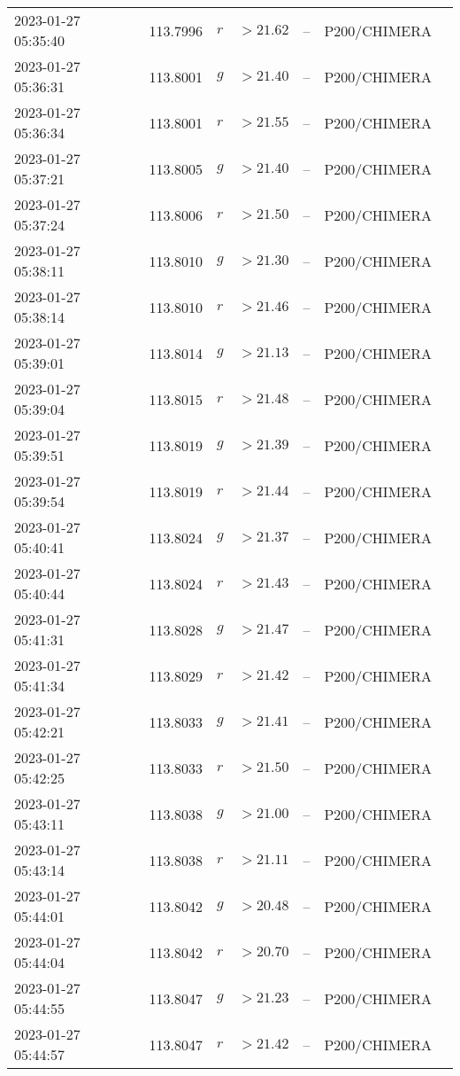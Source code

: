 \documentclass{nature_plusfigure}
\begin{document}
\begin{supplement}
\begin{center}
\begin{longtable}{lllllll}
2023-01-27 05:35:40 & 113.7996 & $r$ & $>21.62$ & -- & P200/CHIMERA &  \\ 
2023-01-27 05:36:31 & 113.8001 & $g$ & $>21.40$ & -- & P200/CHIMERA &  \\ 
2023-01-27 05:36:34 & 113.8001 & $r$ & $>21.55$ & -- & P200/CHIMERA &  \\ 
2023-01-27 05:37:21 & 113.8005 & $g$ & $>21.40$ & -- & P200/CHIMERA &  \\ 
2023-01-27 05:37:24 & 113.8006 & $r$ & $>21.50$ & -- & P200/CHIMERA &  \\ 
2023-01-27 05:38:11 & 113.8010 & $g$ & $>21.30$ & -- & P200/CHIMERA &  \\ 
2023-01-27 05:38:14 & 113.8010 & $r$ & $>21.46$ & -- & P200/CHIMERA &  \\ 
2023-01-27 05:39:01 & 113.8014 & $g$ & $>21.13$ & -- & P200/CHIMERA &  \\ 
2023-01-27 05:39:04 & 113.8015 & $r$ & $>21.48$ & -- & P200/CHIMERA &  \\ 
2023-01-27 05:39:51 & 113.8019 & $g$ & $>21.39$ & -- & P200/CHIMERA &  \\ 
2023-01-27 05:39:54 & 113.8019 & $r$ & $>21.44$ & -- & P200/CHIMERA &  \\ 
2023-01-27 05:40:41 & 113.8024 & $g$ & $>21.37$ & -- & P200/CHIMERA &  \\ 
2023-01-27 05:40:44 & 113.8024 & $r$ & $>21.43$ & -- & P200/CHIMERA &  \\ 
2023-01-27 05:41:31 & 113.8028 & $g$ & $>21.47$ & -- & P200/CHIMERA &  \\ 
2023-01-27 05:41:34 & 113.8029 & $r$ & $>21.42$ & -- & P200/CHIMERA &  \\ 
2023-01-27 05:42:21 & 113.8033 & $g$ & $>21.41$ & -- & P200/CHIMERA &  \\ 
2023-01-27 05:42:25 & 113.8033 & $r$ & $>21.50$ & -- & P200/CHIMERA &  \\ 
2023-01-27 05:43:11 & 113.8038 & $g$ & $>21.00$ & -- & P200/CHIMERA &  \\ 
2023-01-27 05:43:14 & 113.8038 & $r$ & $>21.11$ & -- & P200/CHIMERA &  \\ 
2023-01-27 05:44:01 & 113.8042 & $g$ & $>20.48$ & -- & P200/CHIMERA &  \\ 
2023-01-27 05:44:04 & 113.8042 & $r$ & $>20.70$ & -- & P200/CHIMERA &  \\ 
2023-01-27 05:44:55 & 113.8047 & $g$ & $>21.23$ & -- & P200/CHIMERA &  \\ 
2023-01-27 05:44:57 & 113.8047 & $r$ & $>21.42$ & -- & P200/CHIMERA &  \\ 

\end{longtable}
\end{center}
\end{supplement}
\end{document}
